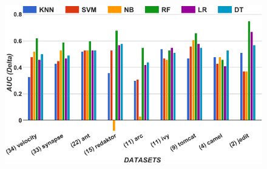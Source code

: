 \begin{figure}[!t]
\begin{minipage}{.5\linewidth}
\centering
        \includegraphics[width=\linewidth]{./fig/AUC_tuned.png}
        

\end{minipage}
\end{figure}
